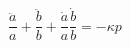\begin{equation}\label{einstein3}
  \frac{\ddot{a}}{a}+\frac{\ddot{b}}{b}+\frac{\dot{a}}{a}\frac{\dot{b}}{b}=-\kappa
  p
\end{equation}

